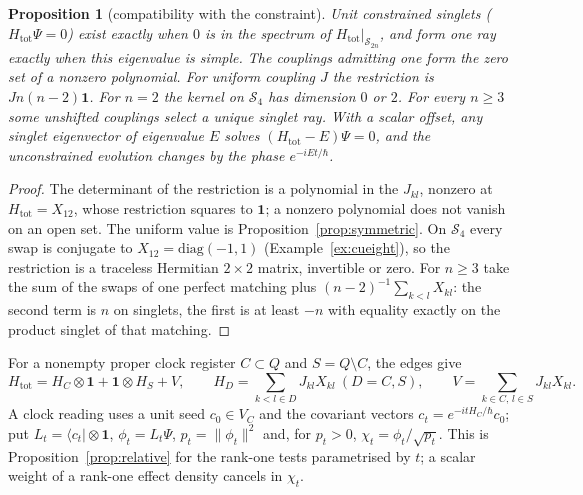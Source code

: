 \documentclass[aps,pra,onecolumn,superscriptaddress,nofootinbib,10pt]{revtex4-2}
\newtheorem{proposition}[theorem]{Proposition}
\theoremstyle{definition}
\theoremstyle{remark}
\begin{document}
\begin{proposition}[compatibility with the constraint]\label{prop:cukernel}
Unit constrained singlets ($H_{\mathrm{tot}}\Psi=0$) exist exactly when $0$ is in the spectrum of $H_{\mathrm{tot}}|_{\mathcal S_{2n}}$, and form one
ray exactly when this eigenvalue is simple.  The couplings admitting one form the zero set of a nonzero
polynomial.  For uniform coupling $J$ the restriction is $Jn(n-2)\mathbf1$.  For $n=2$ the kernel on $\mathcal S_4$ has dimension
$0$ or $2$.  For every $n\ge3$ some unshifted couplings select a unique singlet ray.  With a scalar offset, any
singlet eigenvector of eigenvalue $E$ solves $(H_{\mathrm{tot}}-E)\Psi=0$, and the unconstrained evolution changes by the phase
$e^{-iEt/\hbar}$.
\end{proposition}
\begin{proof}
The determinant of the restriction is a polynomial in the $J_{kl}$, nonzero at $H_{\mathrm{tot}}=X_{12}$, whose restriction
squares to $\mathbf1$; a nonzero polynomial does not vanish on an open set.  The uniform value is Proposition~\ref{prop:symmetric}.
On $\mathcal S_4$ every swap is conjugate to $X_{12}=\mathrm{diag}(-1,1)$ (Example~\ref{ex:cueight}), so the restriction is a traceless
Hermitian $2\times2$ matrix, invertible or zero.  For $n\ge3$ take the sum of the swaps of one perfect matching
plus $(n-2)^{-1}\sum_{k<l}X_{kl}$: the second term is $n$ on singlets, the first is at least $-n$ with equality exactly
on the product singlet of that matching.
\end{proof}

For a nonempty proper clock register $C\subset Q$ and $S=Q\setminus C$, the edges give
\begin{equation}\label{eq:cusplit}
H_{\mathrm{tot}}=H_C\otimes\mathbf1+\mathbf1\otimes H_S+V,\qquad H_D=\sum_{k<l\in D}J_{kl}X_{kl}\ (D=C,S),\qquad V=\sum_{k\in C,\,l\in S}J_{kl}X_{kl}.
\end{equation}
A clock reading uses a unit seed $c_0\in V_C$ and the covariant vectors $c_t=e^{-itH_C/\hbar}c_0$; put $L_t=\langle c_t\rvert\otimes\mathbf1$,
$\phi_t=L_t\Psi$, $p_t=\lVert\phi_t\rVert^2$ and, for $p_t>0$, $\chi_t=\phi_t/\sqrt{p_t}$.  This is Proposition~\ref{prop:relative} for the rank-one tests
parametrised by $t$; a scalar weight of a rank-one effect density cancels in $\chi_t$.
\end{document}
